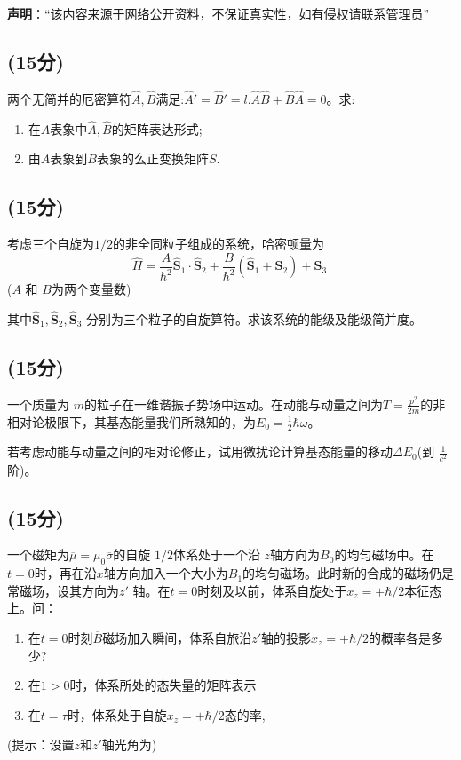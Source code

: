 
\textbf{声明}：“该内容来源于网络公开资料，不保证真实性，如有侵权请联系管理员”

\subsection{(15分)}
两个无简并的厄密算符$\hat{A},\hat{B}$满足:$\hat{A}'=\hat{B}'=l$.$\hat{A}\hat{B}+\hat{B}\hat{A}=0$。求:
\begin{enumerate}
\item 在$A$表象中$\hat{A},\hat{B}$的矩阵表达形式;
\item 由$A$表象到$B$表象的么正变换矩阵$S$.
\end{enumerate}
\subsection{(15分)}
考虑三个自旋为$1/2$的非全同粒子组成的系统，哈密顿量为$$\hat{H} = \frac{A}{\hbar^2} \hat{\mathbf{S}}_1 \cdot \hat{\mathbf{S}}_2 + \frac{B}{\hbar^2} (\hat{\mathbf{S}}_1  + \hat{\mathbf{S}}_2)+\hat{\mathbf{S}}_3~$$ ($A$ 和 $B$为两个变量数)

其中$\hat{\mathbf{S}}_1, \hat{\mathbf{S}}_2, \hat{\mathbf{S}}_3$ 分别为三个粒子的自旋算符。求该系统的能级及能级简并度。
\subsection{(15分)}
 一个质量为 $m$的粒子在一维谐振子势场中运动。在动能与动量之间为$T = \frac{p^2}{2m}$的非相对论极限下，其基态能量我们所熟知的，为$E_0 = \frac{1}{2}\hbar\omega$。

若考虑动能与动量之间的相对论修正，试用微扰论计算基态能量的移动$\Delta E_0$(到 $\frac{1}{c^2}$阶)。
\subsection{(15分)}
一个磁矩为$\overline{\mu} = \mu_0 \overline{\sigma}$的自旋 $1/2$体系处于一个沿 $z$轴方向为$B_0$的均匀磁场中。在$t=0$时，再在沿$x$轴方向加入一个大小为$B_1$的均匀磁场。此时新的合成的磁场仍是常磁场，设其方向为$z'$ 轴。在$t=0$时刻及以前，体系自旋处于$x_{z} = +\hbar/2$本征态上。问：
\begin{enumerate}
\item 在$t=0$时刻$\overline{B}$磁场加入瞬间，体系自旅沿$z'$轴的投影$x_{z} = +\hbar/2$的概率各是多少?
\item 在$1>0$时，体系所处的态失量的矩阵表示
\item 在$t=\tau$时，体系处于自旋$x_{z} = +\hbar/2$态的率,
\end{enumerate}
(提示：设置$z$和$z'$轴光角为)